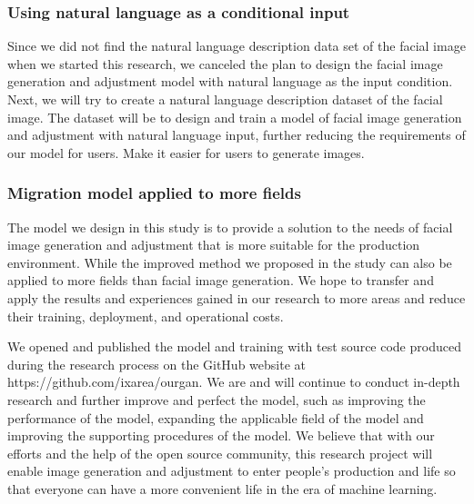\subsubsection*{Using natural language as a conditional input}
Since we did not find the natural language description data set of the facial image when we started this research, we canceled the plan to design the facial image generation and adjustment model with natural language as the input condition.
Next, we will try to create a natural language description dataset of the facial image.
The dataset will be to design and train a model of facial image generation and adjustment with natural language input, further reducing the requirements of our model for users.
Make it easier for users to generate images.
\subsubsection*{Migration model applied to more fields}
The model we design in this study is to provide a solution to the needs of facial image generation and adjustment that is more suitable for the production environment.
While the improved method we proposed in the study can also be applied to more fields than facial image generation.
We hope to transfer and apply the results and experiences gained in our research to more areas and reduce their training, deployment, and operational costs.

\vspace{4ex}

We opened and published the model and training with test source code produced during the research process on the GitHub website at https://github.com/ixarea/ourgan.
We are and will continue to conduct in-depth research and further improve and perfect the model,
    such as improving the performance of the model, expanding the applicable field of the model and improving the supporting procedures of the model.
We believe that with our efforts and the help of the open source community,
    this research project will enable image generation and adjustment to enter people's production and life so that everyone can have a more convenient life in the era of machine learning.






